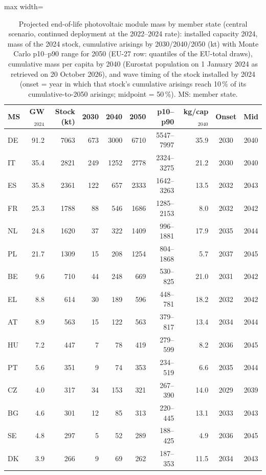\begin{table}[pos=t]\centering\scriptsize
\caption{Projected end-of-life photovoltaic module mass by member state (central scenario, continued deployment at the 2022--2024 rate): installed capacity 2024, mass of the 2024 stock, cumulative arisings by 2030/2040/2050 (kt) with Monte Carlo p10--p90 range for 2050 (EU-27 row: quantiles of the EU-total draws), cumulative mass per capita by 2040 (Eurostat population on 1 January 2024 as retrieved on 20 October 2026), and wave timing of the stock installed by 2024 (onset = year in which that stock's cumulative arisings reach 10\,\% of its cumulative-to-2050 arisings; midpoint = 50\,\%). MS: member state.}
\label{tab:wave}
\begin{adjustbox}{max width=\linewidth}\begin{tabular}{@{}lrrrrrrrcc@{}}\toprule
MS & GW$_{2024}$ & Stock (kt) & 2030 & 2040 & 2050 & p10--p90 & kg/cap$_{2040}$ & Onset & Mid \\ \midrule
DE & 91.2 & 7063 & 673 & 3000 & 6710 & 5547--7997 & 35.9 & 2030 & 2040 \\
IT & 35.4 & 2821 & 249 & 1252 & 2778 & 2324--3275 & 21.2 & 2030 & 2040 \\
ES & 35.8 & 2361 & 122 & 657 & 2333 & 1642--3263 & 13.5 & 2032 & 2043 \\
FR & 25.3 & 1788 & 88 & 546 & 1686 & 1285--2153 & 8.0 & 2032 & 2042 \\
NL & 24.8 & 1620 & 37 & 322 & 1409 & 996--1881 & 17.9 & 2035 & 2044 \\
PL & 21.7 & 1309 & 15 & 208 & 1254 & 804--1868 & 5.7 & 2037 & 2045 \\
BE & 9.6 & 710 & 44 & 248 & 669 & 530--825 & 21.0 & 2031 & 2042 \\
EL & 8.8 & 614 & 30 & 189 & 596 & 448--781 & 18.2 & 2032 & 2042 \\
AT & 8.9 & 563 & 15 & 122 & 563 & 379--817 & 13.4 & 2034 & 2044 \\
HU & 7.2 & 447 & 7 & 78 & 419 & 279--599 & 8.2 & 2036 & 2045 \\
PT & 5.6 & 351 & 9 & 74 & 353 & 234--519 & 6.6 & 2035 & 2044 \\
CZ & 4.0 & 317 & 34 & 153 & 321 & 267--390 & 14.0 & 2029 & 2039 \\
BG & 4.6 & 301 & 12 & 85 & 313 & 220--445 & 13.1 & 2033 & 2043 \\
SE & 4.8 & 297 & 5 & 52 & 289 & 188--425 & 4.9 & 2036 & 2045 \\
DK & 3.9 & 266 & 9 & 69 & 262 & 187--353 & 11.5 & 2034 & 2043 \\

\end{tabular}
\end{adjustbox}
\end{table}
